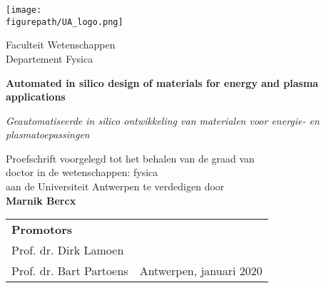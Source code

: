 \begin{titlepage}
   \begin{center}
       \vspace*{1cm}
       
       \texttt{[image: \\figurepath/UA\_logo.png]}
       
       \vspace{1cm}
         
       Faculteit Wetenschappen\\
       Departement Fysica\\
       
       \vspace{3cm}
       
       {\huge
       \textbf{Automated in silico design of materials for energy and plasma applications}
       }
 
       \vspace{0.5cm}
       \textit{Geautomatiseerde in silico ontwikkeling van materialen voor energie- en plasmatoepassingen}
 
       \vfill
       
       Proefschrift voorgelegd tot het behalen van de graad van \\
       doctor in de wetenschappen: fysica \\
       aan de Universiteit Antwerpen te verdedigen door \\
       
        \vspace{1cm}
        \textbf{Marnik Bercx}
       
       \vfill
       
       \begin{tabular}{l @{\hskip 18 em} r}
       \textbf{Promotors} \\ Prof. dr. Dirk Lamoen \\ Prof. dr. Bart Partoens
       & Antwerpen, januari 2020
       \end{tabular}
       
 
       \vspace{0.8cm}
 
       
 
   \end{center}
\end{titlepage}
